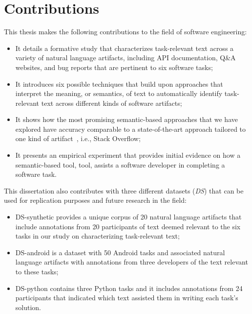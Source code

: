 

\section{Contributions}
\label{cp1:contributions}

This thesis makes the following contributions to the field of software engineering:




\begin{itemize}

    \item It details a formative study that characterizes task-relevant text across a variety of natural language artifacts, including  API documentation, Q\&A websites, and
    bug reports that are pertinent to six software tasks; 

    \item It introduces six possible techniques that build upon approaches that interpret the meaning, or semantics, of text
    to automatically identify task-relevant text across different kinds of software artifacts;


    \item It shows how the most promising semantic-based approaches that we have explored have accuracy comparable to a state-of-the-art approach
    tailored to one kind of artifact~\cite{Xu2017}, i.e., Stack Overflow;

    \item It presents an empirical experiment that provides initial evidence on how  
    a semantic-based tool, \acs{tool}, assists a software developer in completing a software task. 
\end{itemize}





This dissertation also contributes with three different datasets ({\small \textit{DS}}) that can be used for replication purposes and future research in the field:
    
\begin{itemize}
    \item \acs{DS-synthetic} provides a unique corpus of 20 natural language artifacts that include annotations from 20 participants of text deemed relevant to 
    the six tasks in our study on characterizing task-relevant text;
    
    \item \acs{DS-android} is a dataset with 50 Android tasks     
    and associated natural language artifacts 
    with annotations from three developers of the text relevant to these tasks;

    \item \acs{DS-python} contains three Python tasks and it includes annotations from 24 participants that indicated which
    text assisted them in writing each task's solution.
\end{itemize}